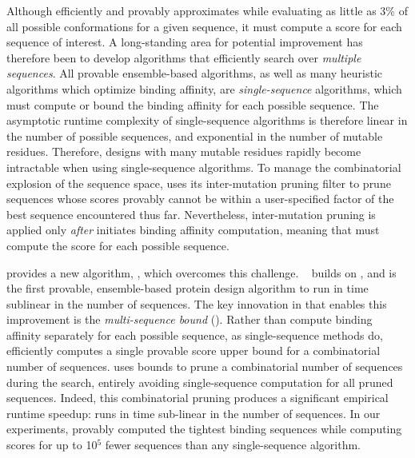 Although \ks efficiently and provably approximates while evaluating as little as 3\% of all possible conformations for a given sequence, \ks it must compute a \ks score for each sequence of interest. A long-standing area for potential improvement has therefore been to develop algorithms that efficiently search over \textit{multiple sequences}. All provable ensemble-based algorithms, as well as many heuristic algorithms which optimize binding affinity, are \emph{single-sequence} algorithms, which must compute or bound the binding affinity for each possible sequence. The asymptotic runtime complexity of single-sequence algorithms is therefore linear in the number of possible sequences, and exponential in the number of mutable residues. Therefore, designs with many mutable residues rapidly become intractable when using single-sequence algorithms. To manage the combinatorial explosion of the sequence space, \ks uses its inter-mutation pruning filter to prune sequences whose \ks scores provably cannot be within a user-specified factor of the best sequence encountered thus far. Nevertheless, inter-mutation pruning is applied only \emph{after} \ks initiates binding affinity computation, meaning that \ks must compute the \ks score for each possible sequence.

 provides a new algorithm, \bbks, which overcomes this challenge. \bbks~\cite{BBK*} builds on \ks, and is the first provable, ensemble-based protein design algorithm to run in time sublinear in the number of sequences. The key innovation in \bbks that enables this improvement is the \emph{multi-sequence bound} (\msbound). Rather than compute binding affinity separately for each possible sequence, as single-sequence methods do, \bbks efficiently computes a single provable \ks score upper bound for a combinatorial number of sequences. \bbks uses \msbound bounds to prune a combinatorial number of sequences during the search, entirely avoiding single-sequence computation for all pruned sequences. Indeed, this combinatorial pruning produces a significant empirical runtime speedup: \bbks runs in time sub-linear in the number of sequences. In our experiments, \bbks provably computed the tightest binding sequences while computing \ks scores for up to 10$^5$ fewer sequences than any single-sequence algorithm.


